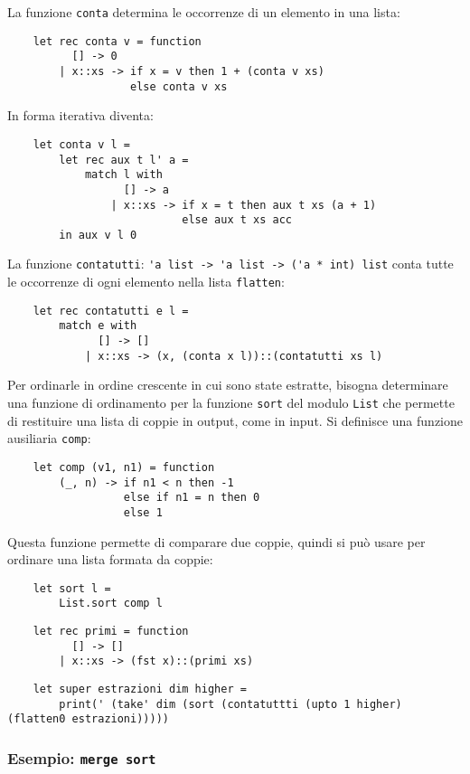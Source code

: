 \documentclass{article}
\numberwithin{equation}{subsection}
\begin{document}
La funzione \verb|conta| determina le occorrenze di un elemento in una lista:
\begin{verbatim}
    let rec conta v = function
          [] -> 0
        | x::xs -> if x = v then 1 + (conta v xs)
                   else conta v xs
\end{verbatim}
In forma iterativa diventa:
\begin{verbatim}
    let conta v l =
        let rec aux t l' a =
            match l with
                  [] -> a
                | x::xs -> if x = t then aux t xs (a + 1)
                           else aux t xs acc
        in aux v l 0
\end{verbatim}
La funzione \verb|contatutti|: \verb|'a list -> 'a list -> ('a * int) list| conta tutte le occorrenze di ogni elemento nella lista \verb|flatten|:
\begin{verbatim}
    let rec contatutti e l =
        match e with
              [] -> []
            | x::xs -> (x, (conta x l))::(contatutti xs l)
\end{verbatim}
Per ordinarle in ordine crescente in cui sono state estratte, bisogna determinare una funzione di ordinamento per la funzione \verb|sort| del modulo \verb|List| che permette di restituire una lista di coppie in output, come in input. Si definisce una funzione ausiliaria \verb|comp|:
\begin{verbatim}
    let comp (v1, n1) = function
        (_, n) -> if n1 < n then -1
                  else if n1 = n then 0
                  else 1
\end{verbatim}
Questa funzione permette di comparare due coppie, quindi si può usare per ordinare una lista formata da coppie:
\begin{verbatim}
    let sort l = 
        List.sort comp l
\end{verbatim}


\begin{verbatim}
    let rec primi = function
          [] -> []
        | x::xs -> (fst x)::(primi xs)
\end{verbatim}

\begin{verbatim}
    let super estrazioni dim higher =
        print(' (take' dim (sort (contatuttti (upto 1 higher) (flatten0 estrazioni)))))
\end{verbatim}

\subsubsection*{Esempio: \texttt{merge sort}}
\end{document}
